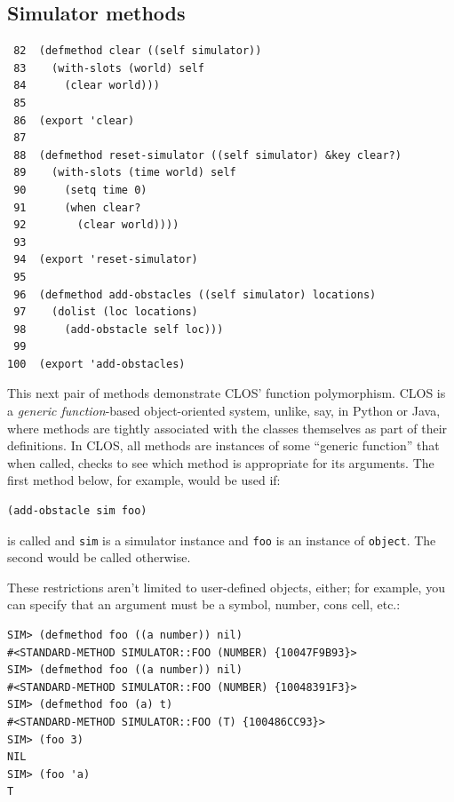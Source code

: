 \documentclass[11pt]{tufte-handout}
\begin{document}
\subsection{Simulator methods}
\label{sec:org2c10004}

\begin{verbatim}
 82  (defmethod clear ((self simulator))
 83    (with-slots (world) self
 84      (clear world)))
 85  
 86  (export 'clear)
 87  
 88  (defmethod reset-simulator ((self simulator) &key clear?)
 89    (with-slots (time world) self
 90      (setq time 0)
 91      (when clear?
 92        (clear world))))
 93  
 94  (export 'reset-simulator)
 95  
 96  (defmethod add-obstacles ((self simulator) locations)
 97    (dolist (loc locations)
 98      (add-obstacle self loc)))
 99  
100  (export 'add-obstacles)
\end{verbatim}

This next pair of methods demonstrate CLOS' function polymorphism.  CLOS is a \emph{generic function}-based object-oriented system, unlike, say, in Python or Java, where methods are tightly associated with the classes themselves as part of their definitions.  In CLOS, all methods are instances of some ``generic function'' that when called, checks to see which method is appropriate for its arguments.  The first method below, for example, would be used if:
\begin{verbatim}
(add-obstacle sim foo)
\end{verbatim}

\noindent is called and \texttt{sim} is a simulator instance and \texttt{foo} is an instance of \texttt{object}.  The second would be called otherwise.

These restrictions aren't limited to user-defined objects, either; for example, you can  specify that an argument must be a symbol, number, cons cell, etc.:
\begin{verbatim}
SIM> (defmethod foo ((a number)) nil)
#<STANDARD-METHOD SIMULATOR::FOO (NUMBER) {10047F9B93}>
SIM> (defmethod foo ((a number)) nil)
#<STANDARD-METHOD SIMULATOR::FOO (NUMBER) {10048391F3}>
SIM> (defmethod foo (a) t)
#<STANDARD-METHOD SIMULATOR::FOO (T) {100486CC93}>
SIM> (foo 3)
NIL
SIM> (foo 'a)
T
\end{verbatim}
\end{document}
